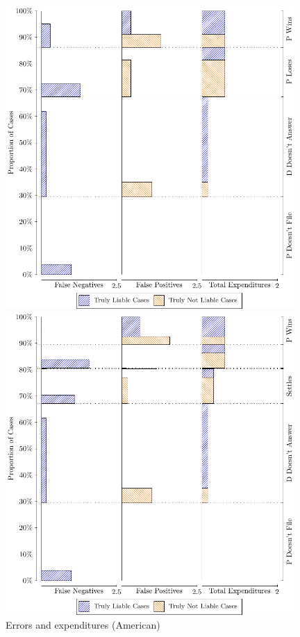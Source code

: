 \documentclass{article}
\begin{document}
\begin{figure}
    \centering
    \begin{minipage}{0.48\textwidth}
        \centering
        \includegraphics[width=0.98\textwidth, scale=0.70, trim={0in 0in 0in 0in}, clip]{../Figures/Source of error costs and expenditures (American)} %
        \caption{Errors and expenditures (American)}
		\label{fig:errors_american}
    \end{minipage}\hfill
    \begin{minipage}{0.48\textwidth}
        \centering
        \includegraphics[width=0.98\textwidth, scale=0.70, trim={0in 0in 0in 0in}, clip]{../Figures/Source of error costs and expenditures (British)} %

\end{minipage}
\end{figure}
\end{document}
